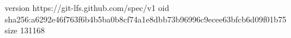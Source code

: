 version https://git-lfs.github.com/spec/v1
oid sha256:a6292e46f763f6b4b5ba0b8cf74a1e8dbb73b96996c9ecee63bfcb6d09f01b75
size 131168
